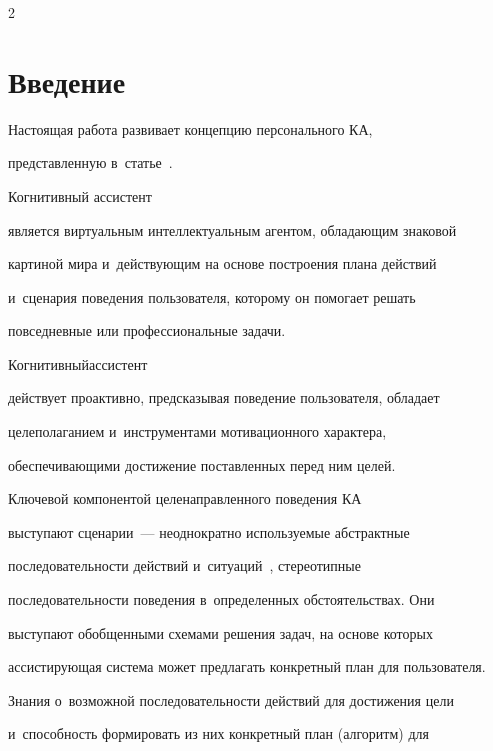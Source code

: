 \begin{multicols}{2}



\label{st\stat}

  

\section{Введение}



  Настоящая работа развивает концепцию персонального КА, 

  представленную в~статье~\cite{1-sm}. 


  Когнитивный ассистент 

является виртуальным интеллектуальным агентом, обладающим знаковой 

\mbox{картиной} мира и~действующим на основе по\-стро\-ения плана действий 

и~сценария поведения пользователя, которому он помогает решать 

повседневные или профессиональные задачи. 

%

Когнитивный\linebreak ас\-сис\-тент 

действует проактивно, предсказывая поведение пользователя, обладает 

целеполаганием и~инструментами мотивационного характера, 

обес\-пе\-чи\-ва\-ющи\-ми достижение поставленных перед ним целей. 

  

  Ключевой компонентой целенаправленного поведения КА

   выступают сценарии~--- неоднократно используемые абстрактные 

последовательности действий и~ситуаций~\cite{2-sm, 3-sm}, стереотипные 

последовательности поведения в~определенных обстоятельствах. Они 

выступают обобщенными схемами решения задач, на основе которых 

ассистирующая система может предлагать конкретный план для пользователя. 

%

Знания о~возможной последовательности действий для достижения цели 

и~способность формировать из них конкретный план (алгоритм) для 


\end{multicols}
